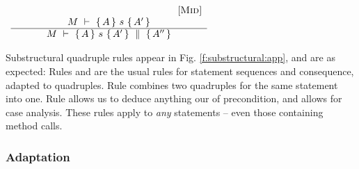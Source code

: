 \begin{center}
$
\begin{array}{c}
\begin{array}{c} \strut \ \ \ \ \ \ \ \ \ \ \ \ \ \ \ \ \ \ \ \ \ \ \ \ \ \ \ \ \ \ \ \ \ \ \ \ \ \ \ \ \ \ \ \ \ \ \ \ \ \ {{\mbox{[\sc{Mid}]}}} \\ M\ \vdash\ \{\,A\, \} \ s\  \{\,A'\, \}  \\ \hline M\ \vdash\ \{\,A\, \} \ s\  \{\,A'\, \}\, \,\parallel\,\, \{\, A'' \, \}  \end{array}
  \end{array}
 $
 \end{center}
 
Substructural quadruple rules appear in  Fig. \ref{f:substructural:app}, and are as expected: 
Rules   {} and {} are  the usual rules for statement sequences and consequence, adapted to quadruples.
Rule {} combines two quadruples for the same statement into one.
Rule  {} allows us to deduce anything our of  precondition, and  {} allows for case analysis.
These  rules  apply to \emph{any} statements -- even those containing method calls.

\subsubsection{Adaptation}

 \label{s:preserve:encaps}
 \label{s:viewAndProtect}
 
 


